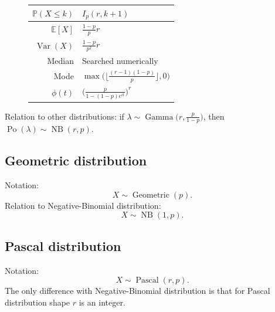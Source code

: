 \documentclass[a4paper,11pt]{article}
\theoremstyle{plain}
\theoremstyle{definition}
\newcommand{\ME}{\mathbb{E}}
\newcommand{\MP}{\mathbb{P}}
\newcommand{\Var}{\operatorname{Var}}
\begin{document}
\begin{figure}[!htb]
\begin{minipage}{0.4\textwidth}
\begin{tabular}{| r | l |}
				\hline
				$\MP(X \leq k)$ & $I_p(r, k+1)$ \\
				\hline
				$\ME[X]$ & $ \frac{1-p}{p}r$ \\
				\hline
				$\Var(X)$ & $ \frac{1-p}{p^2}r $ \\
				\hline
				Median & Searched numerically \\
				\hline
				Mode & $ \max\Big(\Big\lfloor  \frac{(r-1)(1-p)}{p} \Big\rfloor, 0\Big)  $ \\
				\hline
				$\phi(t)$ & $\Big( \frac{p}{1-(1-p)e^{it}} \Big)^r$  \\
				\hline
			\end{tabular}
		\end{minipage}
	\end{figure}
	Relation to other distributions: if $\lambda \sim \operatorname{Gamma}\big(r, \frac{p}{1-p}\big)$, then $\operatorname{Po}(\lambda) \sim \operatorname{NB}(r, p)$.
	
	\subsection{Geometric distribution}
	Notation:
	\[
	X \sim \operatorname{Geometric}(p).
	\]
	Relation to Negative-Binomial distribution:
	\[
	X \sim \operatorname{NB}(1, p).
	\]
	\subsection{Pascal distribution}
	Notation:
	\[
	X \sim \operatorname{Pascal}(r, p).
	\]
	The only difference with Negative-Binomial distribution is that for Pascal distribution shape $r$ is an integer.
	
	\pagebreak
\end{document}
